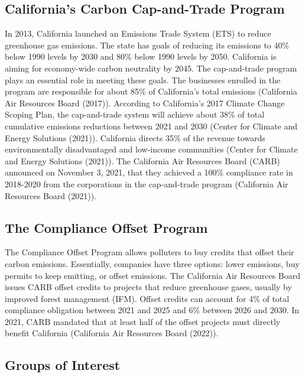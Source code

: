 \documentclass[11pt]{article}
\begin{document}
\subsection*{California's Carbon Cap-and-Trade Program}

In 2013, California launched an Emissions Trade System (ETS) to reduce greenhouse gas emissions. The state has goals of reducing its emissions to 40\% below 1990 levels by 2030 and 80\% below 1990 levels by 2050. California is aiming for economy-wide carbon neutrality by 2045. The cap-and-trade program plays an essential role in meeting these goals. The businesses enrolled in the program are responsible for about 85\% of California's total emissions (California Air Resources Board (2017)). According to California's 2017 Climate Change Scoping Plan, the cap-and-trade system will achieve about 38\% of total cumulative emissions reductions between 2021 and 2030 (Center for Climate and Energy Solutions (2021)). California directs 35\% of the revenue towards environmentally disadvantaged and low-income communities (Center for Climate and Energy Solutions (2021)). The California Air Resources Board (CARB) announced on November 3, 2021, that they achieved a 100\% compliance rate in 2018-2020 from the corporations in the cap-and-trade program (California Air Resources Board (2021)).


\subsection*{The Compliance Offset Program} 

The Compliance Offset Program allows polluters to buy credits that offset their carbon emissions. Essentially, companies have three options: lower emissions, buy permits to keep emitting, or offset emissions. The California Air Resources Board issues CARB offset credits to projects that reduce greenhouse gases, usually by improved forest management (IFM). Offset credits can account for 4\% of total compliance obligation between 2021 and 2025 and 6\% between 2026 and 2030. In 2021, CARB mandated that at least half of the offset projects must directly benefit California (California Air Resources Board (2022)).

\subsection*{Groups of Interest}
\end{document}
